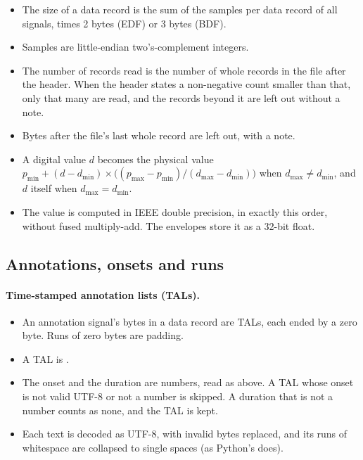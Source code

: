 \begin{itemize}
\item The size of a data record is the sum of the samples per data record of all signals, times
  2 bytes (EDF) or 3 bytes (BDF).
\item Samples are little-endian two's-complement integers.
\item The number of records read is the number of whole records in the file after the header.
  When the header states a non-negative count smaller than that, only that many are read, and the
  records beyond it are left out without a note.
\item Bytes after the file's last whole record are left out, with a note.
\item A digital value $d$ becomes the physical value
  $p_{\min} + (d - d_{\min}) \times \bigl((p_{\max} - p_{\min}) / (d_{\max} - d_{\min})\bigr)$
  when $d_{\max} \neq d_{\min}$, and $d$ itself when $d_{\max} = d_{\min}$.
\item The value is computed in IEEE double precision, in exactly this order, without fused
  multiply-add. The envelopes store it as a 32-bit float.
\end{itemize}

\subsection{Annotations, onsets and runs}
\label{sec:formats-reference-edf-annotations}

\paragraph{Time-stamped annotation lists (TALs).}
\begin{itemize}
\item An annotation signal's bytes in a data record are TALs, each ended by a zero byte. Runs of
  zero bytes are padding.
\item A TAL is .
\item The onset and the duration are numbers, read as above. A TAL whose onset is not valid UTF-8
  or not a number is skipped. A duration that is not a number counts as none, and the TAL is
  kept.
\item Each text is decoded as UTF-8, with invalid bytes replaced, and its runs of whitespace are
  collapsed to single spaces (as Python's  does).
\end{itemize}

